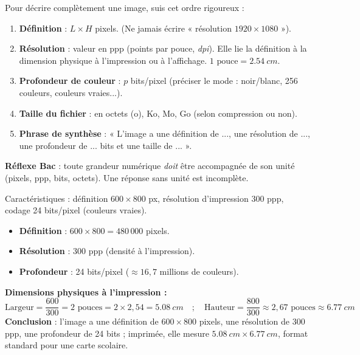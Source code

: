 \documentclass[11pt]{article}
\newcommand{\cle}[1]{{\popxbold\color{popdark}#1}}
\begin{document}
\begin{methode}
Pour décrire complètement une image, suis cet ordre rigoureux :
\begin{enumerate}
\item \textbf{Définition} : $L \times H$ \cle{pixels}. (Ne jamais écrire « résolution $1920 \times 1080$ »).
\item \textbf{Résolution} : valeur en \cle{ppp} (points par pouce, \emph{dpi}). Elle lie la définition à la dimension physique à l'impression ou à l'affichage. $1 \text{ pouce} = \SI{2,54}{cm}$.
\item \textbf{Profondeur de couleur} : $p$ bits/pixel (préciser le mode : noir/blanc, 256 couleurs, couleurs vraies...).
\item \textbf{Taille du fichier} : en octets (o), Ko, Mo, Go (selon compression ou non).
\item \textbf{Phrase de synthèse} : « L'image a une définition de ..., une résolution de ..., une profondeur de ... bits et une taille de ... ».
\end{enumerate}
\textbf{Réflexe Bac} : toute grandeur numérique \emph{doit} être accompagnée de son unité (pixels, ppp, bits, octets). Une réponse sans unité est incomplète.
\end{methode}

\begin{exemplebox}
Caractéristiques : définition $600 \times 800$ px, résolution d'impression 300 ppp, codage 24 bits/pixel (couleurs vraies).
\begin{itemize}
\item \textbf{Définition} : $600 \times 800 = 480\,000$ pixels.
\item \textbf{Résolution} : 300 ppp (densité à l'impression).
\item \textbf{Profondeur} : 24 bits/pixel ($\approx 16,7$ millions de couleurs).
\end{itemize}
\textbf{Dimensions physiques à l'impression :}
\[
\text{Largeur} = \frac{600}{300} = 2 \text{ pouces} = 2 \times 2,54 = \SI{5,08}{cm}
\quad;\quad
\text{Hauteur} = \frac{800}{300} \approx 2,67 \text{ pouces} \approx \SI{6,77}{cm}
\]
\textbf{Conclusion} : l'image a une définition de $600 \times 800$ pixels, une résolution de 300 ppp, une profondeur de 24 bits ; imprimée, elle mesure $\SI{5,08}{cm} \times \SI{6,77}{cm}$, format standard pour une carte scolaire.
\end{exemplebox}
\end{document}
